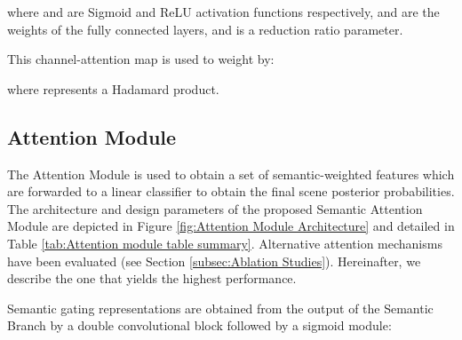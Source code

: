 \documentclass[review, 3p, sort&compress]{elsarticle}
\begin{document}
where  and  are Sigmoid and ReLU activation functions respectively,  and  are the weights of the fully connected layers, and  is a reduction ratio parameter.

This channel-attention map is used to weight  by: 


where  represents a Hadamard product.

\subsection{Attention Module}
\label{subsec:Attention module}
The Attention Module is used to obtain a set of semantic-weighted features  which are forwarded to a linear classifier to obtain the final scene posterior probabilities. The architecture and design parameters of the proposed Semantic Attention Module are depicted in Figure \ref{fig:Attention Module Architecture} and detailed in Table \ref{tab:Attention module table summary}. Alternative attention mechanisms have been evaluated (see Section \ref{subsec:Ablation Studies}). Hereinafter, we describe the one that yields the highest performance.

\begin{table}
\end{table}


Semantic gating representations  are obtained from the output of the Semantic Branch  by a double convolutional block followed by a sigmoid module:
\end{document}
